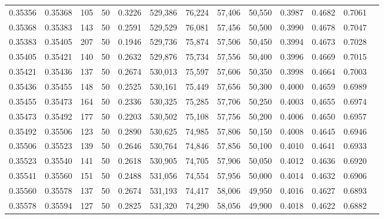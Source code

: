 \begin{tabular}{rrrrrrrrrrrrr}
0.35356 & 0.35368 &   105 &  50 &                                     0.3226 & 529,386 &  76,224 &  57,406 &  50,550 & 0.3987 & 0.4682 & 0.7061 \\
0.35368 & 0.35383 &   143 &  50 &                                     0.2591 & 529,529 &  76,081 &  57,456 &  50,500 & 0.3990 & 0.4678 & 0.7047 \\
0.35383 & 0.35405 &   207 &  50 &                                     0.1946 & 529,736 &  75,874 &  57,506 &  50,450 & 0.3994 & 0.4673 & 0.7028 \\
0.35405 & 0.35421 &   140 &  50 &                                     0.2632 & 529,876 &  75,734 &  57,556 &  50,400 & 0.3996 & 0.4669 & 0.7015 \\
0.35421 & 0.35436 &   137 &  50 &                                     0.2674 & 530,013 &  75,597 &  57,606 &  50,350 & 0.3998 & 0.4664 & 0.7003 \\
0.35436 & 0.35455 &   148 &  50 &                                     0.2525 & 530,161 &  75,449 &  57,656 &  50,300 & 0.4000 & 0.4659 & 0.6989 \\
0.35455 & 0.35473 &   164 &  50 &                                     0.2336 & 530,325 &  75,285 &  57,706 &  50,250 & 0.4003 & 0.4655 & 0.6974 \\
0.35473 & 0.35492 &   177 &  50 &                                     0.2203 & 530,502 &  75,108 &  57,756 &  50,200 & 0.4006 & 0.4650 & 0.6957 \\
0.35492 & 0.35506 &   123 &  50 &                                     0.2890 & 530,625 &  74,985 &  57,806 &  50,150 & 0.4008 & 0.4645 & 0.6946 \\
0.35506 & 0.35523 &   139 &  50 &                                     0.2646 & 530,764 &  74,846 &  57,856 &  50,100 & 0.4010 & 0.4641 & 0.6933 \\
0.35523 & 0.35540 &   141 &  50 &                                     0.2618 & 530,905 &  74,705 &  57,906 &  50,050 & 0.4012 & 0.4636 & 0.6920 \\
0.35541 & 0.35560 &   151 &  50 &                                     0.2488 & 531,056 &  74,554 &  57,956 &  50,000 & 0.4014 & 0.4632 & 0.6906 \\
0.35560 & 0.35578 &   137 &  50 &                                     0.2674 & 531,193 &  74,417 &  58,006 &  49,950 & 0.4016 & 0.4627 & 0.6893 \\
0.35578 & 0.35594 &   127 &  50 &                                     0.2825 & 531,320 &  74,290 &  58,056 &  49,900 & 0.4018 & 0.4622 & 0.6882 \\

\end{tabular}
